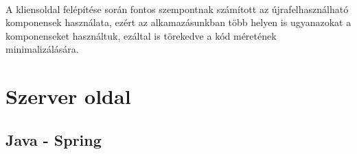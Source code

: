 \paragraph{} A kliensoldal felépítése során fontos szempontnak számított az újrafelhasználható komponensek használata, ezért az alkamazásunkban több helyen is ugyanazokat a komponenseket használtuk, ezáltal is törekedve a kód méretének minimalizálására.

\section{Szerver oldal}
\subsection{Java - Spring}
